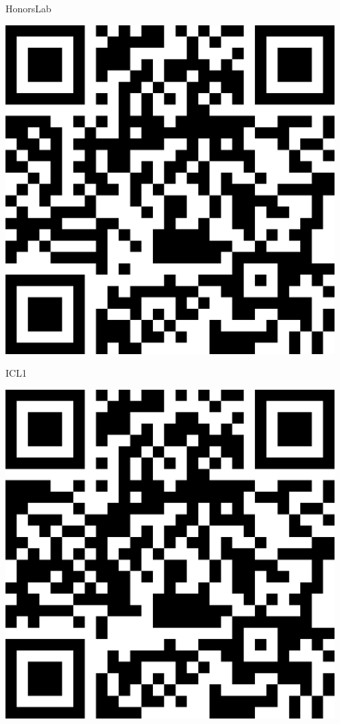 \documentclass[letterpaper]{article}
\begin{document}
 \hfill{\small HonorsLab} 

 \vspace{1in} 
 \pagebreak 
{} 
 \vspace*{\fill} 
 \begingroup 
 \centerline{\includegraphics[scale=1,width=5in,height=5in]{ICL1.png}} 
 \endgroup 
 \vspace*{\fill} 

 \hfill{\small ICL1} 

 \vspace{1in} 
 \pagebreak 
{} 
 \vspace*{\fill} 
 \begingroup 
 \centerline{\includegraphics[scale=1,width=5in,height=5in]{ICL2.png}} 
 \endgroup 
 \vspace*{\fill} 
\end{document}
